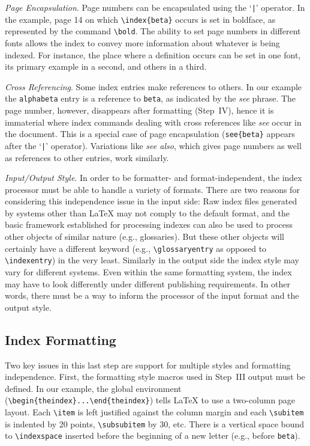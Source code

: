 {\it Page Encapsulation\/}.  Page numbers can be encapsulated
using the `\verb#|#' operator.  In the example,
page 14 on which \verb|\index{beta}| occurs is set in boldface, as
represented by the command \verb|\bold|.  The ability to set
page numbers in different fonts allows the index to convey
more information about whatever is being indexed.  For instance,
the place where a definition occurs can be set in one font, its
primary example in a second, and others in a third.

{\it Cross Referencing\/}.  Some index entries make references to
others.  In our example the \verb|alphabeta| entry is a reference
to \verb|beta|, as indicated by the {\it see\/} phrase.
The page number, however, disappears after formatting (Step~IV),
hence it is immaterial where index commands dealing with cross references
like {\it see\/} occur in the document.
This is a special case of page encapsulation (\verb|see{beta}| appears
after the `\verb#|#' operator).
Variations like {\it see also\/}, which gives page numbers as well
as references to other entries, work similarly.

{\it Input/Output Style\/}.  In order to be
formatter- and format-independent, the index processor must be able
to handle a variety of formats.  There are two reasons for considering
this independence issue in the input side:
Raw index files generated by systems
other than {\LaTeX} may not comply to the default format, and
the basic framework established for processing indexes can also be
used to process other objects of similar nature (e.g., glossaries).
But these other objects will certainly have a different keyword
(e.g., \verb|\glossaryentry| as opposed to \verb|\indexentry|)
in the very least.
Similarly in the output side the index style
may vary for different systems.  Even within the same formatting
system, the index may have to look differently under different
publishing requirements.   In other words, there must be a way to inform
the processor of the input format and the output style.


\subsection{Index Formatting}
Two key issues in this last step are
support for multiple styles and formatting independence.
First, the formatting style macros used in Step~III output
must be defined.  In our example,
the global environment (\verb|\begin{theindex}...\end{theindex}|) tells
{\LaTeX} to use a two-column page layout.  Each \verb|\item| is
left justified against the column margin and each \verb|\subitem| is indented
by 20 points, \verb|\subsubitem| by 30, etc.
There is a vertical space bound to
\verb|\indexspace| inserted before the beginning of a new letter
(e.g., before \verb|beta|).

